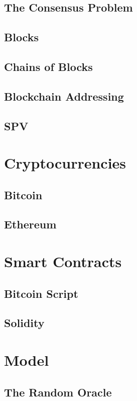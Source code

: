 \subsection{The Consensus Problem}
\subsection{Blocks}
\subsection{Chains of Blocks}
\subsection{Blockchain Addressing}
\subsection{SPV}

\section{Cryptocurrencies}

\subsection{Bitcoin}
\subsection{Ethereum}

\section{Smart Contracts}
\subsection{Bitcoin Script}
\subsection{Solidity}


\section{Model}
\subsection{The Random Oracle}

